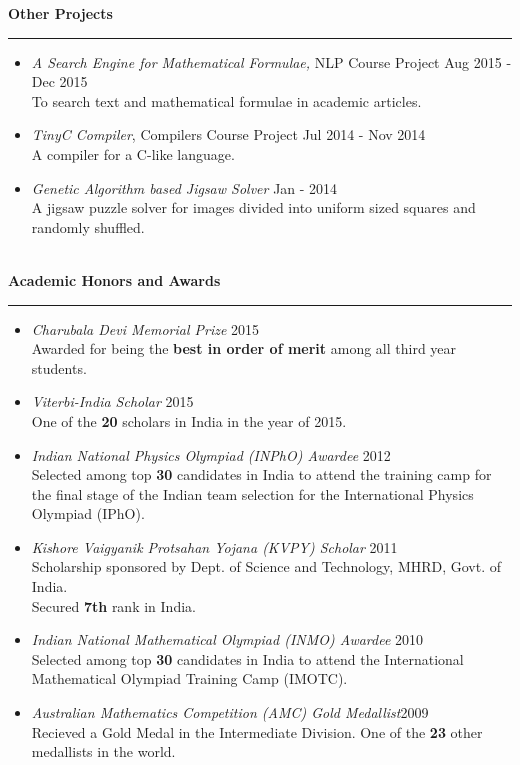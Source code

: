 \documentclass[a4paper,10pt,oneside]{article}
\newcommand{\heading}[1]{
 {\Large \textbf{#1}}
  \vspace{0.4em}
  \hrule
  \vspace{0.4em}
}
\newcommand{\EntryGap}{ ~\\ }
\begin{document}
\heading{Other Projects}
\begin{itemize}
  \setlength{\itemsep}{0.0em}
  \item \emph{A Search Engine for Mathematical Formulae,} NLP Course Project \hfill Aug 2015 - Dec 2015\\
  To search text and mathematical formulae in academic articles.
  \item \emph{TinyC Compiler}, Compilers Course Project \hfill Jul 2014 - Nov 2014\\
  A compiler for a C-like language.
  \item \emph{Genetic Algorithm based Jigsaw Solver} \hfill Jan - 2014\\
  A jigsaw puzzle solver for images divided into uniform sized squares and randomly shuffled.
\end{itemize}


\EntryGap
\heading{Academic Honors and Awards}
\begin{itemize}
 \setlength{\itemsep}{0.0em}
 \item \emph{Charubala Devi Memorial Prize} \hfill 2015\\
Awarded for being the \textbf{best in order of merit} among all third year students.
\item \emph{Viterbi-India Scholar} \hfill 2015\\
One of the \textbf{20} scholars in India in the year of 2015.
\item \emph{Indian National Physics Olympiad (INPhO) Awardee} \hfill 2012\\
Selected among top \textbf{30} candidates in India to attend the training camp for the final stage of the Indian team selection for the International Physics Olympiad (IPhO).
\item\emph{Kishore Vaigyanik Protsahan Yojana (KVPY) Scholar} \hfill 2011\\
Scholarship sponsored by Dept. of Science and Technology, MHRD, Govt. of India.\\
Secured \textbf{7th} rank in India.
\item\emph{Indian National Mathematical Olympiad (INMO) Awardee} \hfill 2010\\
Selected among top \textbf{30} candidates in India to attend the International Mathematical Olympiad Training Camp (IMOTC).
\item\emph{Australian Mathematics Competition (AMC) Gold Medallist}\hfill 2009\\
Recieved a Gold Medal in the Intermediate Division. One of the \textbf{23} other medallists in the world.
\end{itemize}
\end{document}
